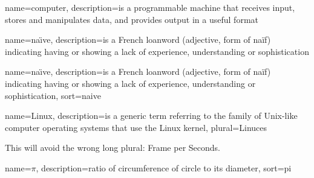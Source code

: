 {
  name=computer,
  description={is a programmable machine that receives input,
               stores and manipulates data, and provides
               output in a useful format}
}

{
  name=na\"{\i}ve,
  description={is a French loanword (adjective, form of naïf)
               indicating having or showing a lack of experience,
               understanding or sophistication}
}

{
  name=na\"{\i}ve,
  description={is a French loanword (adjective, form of naïf)
               indicating having or showing a lack of experience,
               understanding or sophistication},
  sort=naive
}

{
  name=Linux,
  description={is a generic term referring to the family of Unix-like
               computer operating systems that use the Linux kernel},
  plural=Linuces
}

This will avoid the wrong long plural: Frame per Seconds.



{
  name={\ensuremath{\pi}},
  description={ratio of circumference of circle to its
               diameter},
  sort=pi
}

